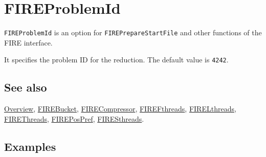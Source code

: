 \documentclass[../FeynHelpersManual.tex]{subfiles}
\begin{document}
\hypertarget{fireproblemid}{
\section{FIREProblemId}\label{fireproblemid}}

\texttt{FIREProblemId} is an option for \texttt{FIREPrepareStartFile}
and other functions of the FIRE interface.

It specifies the problem ID for the reduction. The default value is
\texttt{4242}.

\subsection{See also}

\hyperlink{toc}{Overview}, \hyperlink{firebucket}{FIREBucket},
\hyperlink{firecompressor}{FIRECompressor},
\hyperlink{firefthreads}{FIREFthreads},
\hyperlink{firelthreads}{FIRELthreads},
\hyperlink{firethreads}{FIREThreads},
\hyperlink{firepospref}{FIREPosPref},
\hyperlink{firesthreads}{FIRESthreads}.

\subsection{Examples}
\end{document}
